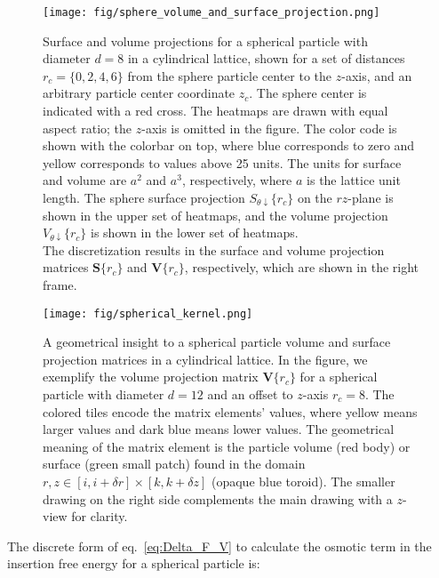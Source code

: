 \documentclass[10pt, a4paper]{article}
\begin{document}
\begin{multicols}{2}
\begin{figure}[H]
    \centering
    \texttt{[image: fig/sphere\_volume\_and\_surface\_projection.png]}
    \caption{
        Surface and volume projections for a spherical particle with diameter $d = 8$ in a cylindrical lattice, shown for a set of distances $r_c = \{0, 2, 4, 6\}$ from the sphere particle center to the $z$-axis, and an arbitrary particle center coordinate $z_c$.
        The sphere center is indicated with a red cross.
        The heatmaps are drawn with equal aspect ratio; the $z$-axis is omitted in the figure.
        The color code is shown with the colorbar on top, where blue corresponds to zero and yellow corresponds to values above 25 units.
        The units for surface and volume are $a^2$ and $a^3$, respectively, where $a$ is the lattice unit length.
        The sphere surface projection $S_{\theta \downarrow}\{r_c\}$ on the $rz$-plane is shown in the upper set of heatmaps, and the volume projection $V_{\theta \downarrow}\{r_c\}$ is shown in the lower set of heatmaps.
        \\
        The discretization results in the surface and volume projection matrices $\bm{S}\{r_c\}$ and $\bm{V}\{r_c\}$, respectively, which are shown in the right frame.
    }
    \label{fig:sphere_volume_and_surface_projection}
\end{figure}


\begin{figure}[H]
    \centering
    \texttt{[image: fig/spherical\_kernel.png]}
    \caption{
        A geometrical insight to a spherical particle volume and surface projection matrices in a cylindrical lattice.
        In the figure, we exemplify the volume projection matrix $\bm{V}\{r_c\}$ for a spherical particle with diameter $d = 12$ and an offset to $z$-axis $r_c= 8$.
        The colored tiles encode the matrix elements' values, where yellow means larger values and dark blue means lower values.
        The geometrical meaning of the matrix element is the particle volume (red body) or surface (green small patch) found in the domain $r,z \in [i, i + \delta r] \times [k, k + \delta z]$ (opaque blue toroid).
        The smaller drawing on the right side complements the main drawing with a $z$-view for clarity.
    }
    \label{fig:spherical_kernel}
\end{figure}

The discrete form of eq.~\ref{eq:Delta_F_V} to calculate the osmotic term in the insertion free energy for a spherical particle is:


\end{multicols}
\end{document}
